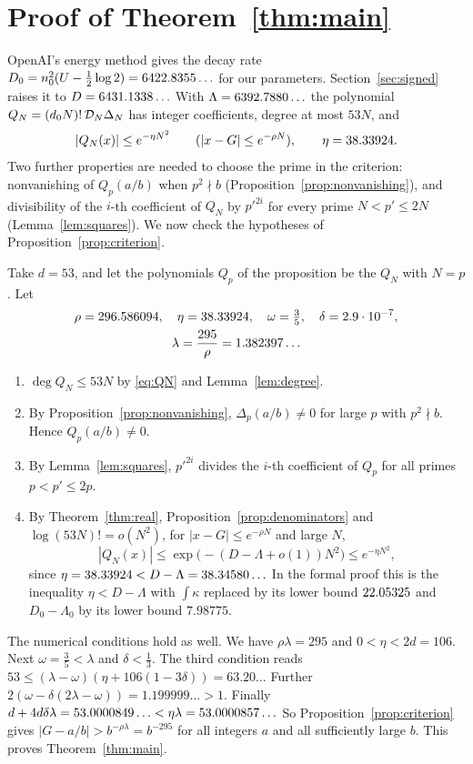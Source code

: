 \section{Proof of Theorem~\ref{thm:main}}\label{sec:proof}

OpenAI's energy method gives the decay rate $D_0=n_0^2(U-\frac12\log2)=6422.8355\ldots$ for our parameters.
Section~\ref{sec:signed} raises it to $D=6431.1338\ldots$ With $\Lambda=6392.7880\ldots$ the polynomial
$Q_N=(d_0N)!\,\mathcal D_N\Delta_N$ has integer coefficients, degree at most $53N$, and
\[
 |Q_N(x)|\le e^{-\eta N^2}\qquad(|x-G|\le e^{-\rho N}),\qquad \eta=38.33924 .
\]
Two further properties are needed to choose the prime in the criterion: nonvanishing of $Q_p(a/b)$ when
$p^2\nmid b$ (Proposition~\ref{prop:nonvanishing}), and divisibility of the $i$-th coefficient of $Q_N$ by
$p'^{2i}$ for every prime $N<p'\le2N$ (Lemma~\ref{lem:squares}). We now check the hypotheses of
Proposition~\ref{prop:criterion}.

Take $d=53$, and let the polynomials $Q_p$ of the proposition be the $Q_N$ with $N=p$. Let
\begin{gather*}
 \rho=296.586094,\quad \eta=38.33924,\quad \omega=\tfrac35,\quad \delta=2.9\cdot10^{-7},\\
 \lambda=\frac{295}{\rho}=1.382397\ldots
\end{gather*}
\begin{enumerate}[label=(\alph*)]
\item $\deg Q_N\le53N$ by \eqref{eq:QN} and Lemma~\ref{lem:degree}.
\item By Proposition~\ref{prop:nonvanishing}, $\Delta_p(a/b)\ne0$ for large $p$ with $p^2\nmid b$. Hence
$Q_p(a/b)\ne0$.
\item By Lemma~\ref{lem:squares}, $p'^{2i}$ divides the $i$-th coefficient of $Q_p$ for all primes
$p<p'\le2p$.
\item By Theorem~\ref{thm:real}, Proposition~\ref{prop:denominators} and $\log(53N)!=o(N^2)$, for
$|x-G|\le e^{-\rho N}$ and large $N$,
\[
 |Q_N(x)|\le\exp\bigl(-(D-\Lambda+o(1))N^2\bigr)\le e^{-\eta N^2},
\]
since $\eta=38.33924<D-\Lambda=38.34580\ldots$ In the formal proof this is the inequality $\eta<D-\Lambda$ with
$\int\kappa$ replaced by its lower bound $22.05325$ and $D_0-\Lambda_0$ by its lower bound $7.98775$.
\end{enumerate}
The numerical conditions hold as well. We have $\rho\lambda=295$ and $0<\eta<2d=106$. Next $\omega=\frac35<\lambda$ and
$\delta<\frac13$. The third condition reads $53\le(\lambda-\omega)(\eta+106(1-3\delta))=63.20\ldots$ Further
$2(\omega-\delta(2\lambda-\omega))=1.199999\ldots>1$. Finally
$d+4d\delta\lambda=53.0000849\ldots<\eta\lambda=53.0000857\ldots$ So Proposition~\ref{prop:criterion} gives
$|G-a/b|>b^{-\rho\lambda}=b^{-295}$ for all integers $a$ and all sufficiently large $b$. This proves
Theorem~\ref{thm:main}.


